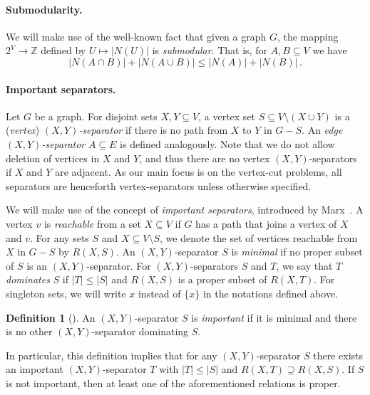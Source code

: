 \documentclass[a4paper,11pt]{article}
\theoremstyle{definition}
\newtheorem{definition}[theorem]{Definition}
\theoremstyle{remark}
\newcommand{\Z}{\mathbb{Z}}
\newcommand{\card}[1]{\left\lvert {#1} \right\rvert}
\newcommand{\vbound}[1]{\card{N(#1)}}
\begin{document}
\paragraph{Submodularity.} We will make use of the well-known fact that given a graph $G$, the mapping $2^V \to \Z$ defined by $U \mapsto \vbound{U}$ is \emph{submodular}. That is, for $A, B \subseteq V$ we have
\begin{equation}
\vbound{A\cap B}+\vbound{A\cup B} \le \vbound{A}+ \vbound{B}\,.\label{eq:vsubm}
\end{equation}

\paragraph{Important separators.} Let $G$ be a graph. For disjoint sets $X, Y \subseteq V$, a vertex set $S \subseteq V \setminus (X \cup Y)$ is a (\emph{vertex}) \emph{$(X,Y)$-separator} if there is no path from $X$ to $Y$ in $G-S$. An \emph{edge $(X,Y)$-separator} $A \subseteq E$ is defined analogously. 
Note that we do not allow deletion of vertices in $X$ and $Y$, and thus there are no vertex $(X,Y)$-separators if $X$ and $Y$ are adjacent.
As our main focus is on the vertex-cut problems, all separators are henceforth vertex-separators unless otherwise specified.

We will make use of the concept of \emph{important separators}, introduced by Marx~\cite{marx2006parameterized}.
A vertex $v$ is \emph{reachable} from a set $X\subseteq V$ if $G$ has a path that joins a vertex of $X$ and $v$. 
For any sets $S$ and $X \subseteq V \setminus S$, we denote the set of vertices reachable from $X$ in $G-S$ by $R(X,S)$.
An $(X,Y)$-separator $S$ is \emph{minimal} if no proper subset of $S$ is an $(X,Y)$-separator. For $(X,Y)$-separators $S$ and $T$, we say that $T$ \emph{dominates} $S$ if $\card{T} \le \card{S}$ and $R(X,S)$ is a proper subset of $R(X,T)$.
For singleton sets, we will write $x$ instead of $\{ x \}$ in the notations defined above.

\begin{definition}[\cite{marx2006parameterized}]
An $(X,Y)$-separator $S$ is \emph{important} if it is minimal and there is no other $(X,Y)$-separator dominating $S$.
\end{definition}

In particular, this definition implies that for any $(X,Y)$-separator $S$ there exists an important $(X,Y)$-separator $T$ with $\card{T} \le \card{S}$ and $R(X,T) \supseteq R(X,S)$. If $S$ is not important, then at least one of the aforementioned relations is proper.
\end{document}
